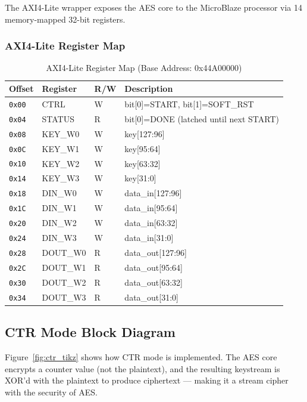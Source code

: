 \documentclass[12pt,a4paper]{article}
\begin{document}
The AXI4-Lite wrapper exposes the AES core to the MicroBlaze processor via 14 memory-mapped 32-bit registers.

\subsubsection{AXI4-Lite Register Map}

\begin{table}[H]
\centering
\caption{AXI4-Lite Register Map (Base Address: 0x44A00000)}
\begin{tabular}{lllp{5cm}}
\toprule
\textbf{Offset} & \textbf{Register} & \textbf{R/W} & \textbf{Description} \\
\midrule
\texttt{0x00} & CTRL    & W & bit[0]=START, bit[1]=SOFT\_RST \\
\texttt{0x04} & STATUS  & R & bit[0]=DONE (latched until next START) \\
\texttt{0x08} & KEY\_W0 & W & key[127:96] \\
\texttt{0x0C} & KEY\_W1 & W & key[95:64] \\
\texttt{0x10} & KEY\_W2 & W & key[63:32] \\
\texttt{0x14} & KEY\_W3 & W & key[31:0] \\
\texttt{0x18} & DIN\_W0 & W & data\_in[127:96] \\
\texttt{0x1C} & DIN\_W1 & W & data\_in[95:64] \\
\texttt{0x20} & DIN\_W2 & W & data\_in[63:32] \\
\texttt{0x24} & DIN\_W3 & W & data\_in[31:0] \\
\texttt{0x28} & DOUT\_W0 & R & data\_out[127:96] \\
\texttt{0x2C} & DOUT\_W1 & R & data\_out[95:64] \\
\texttt{0x30} & DOUT\_W2 & R & data\_out[63:32] \\
\texttt{0x34} & DOUT\_W3 & R & data\_out[31:0] \\
\bottomrule
\end{tabular}
\end{table}

\subsection{CTR Mode Block Diagram}

Figure~\ref{fig:ctr_tikz} shows how CTR mode is implemented. The AES core encrypts a counter value (not the plaintext), and the resulting keystream is XOR'd with the plaintext to produce ciphertext --- making it a stream cipher with the security of AES.
\end{document}
